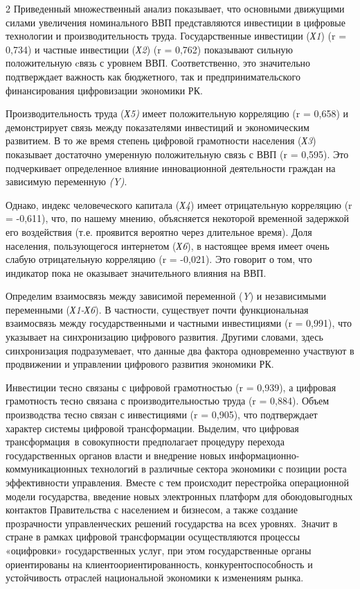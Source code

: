 \begin{multicols}{2}
Приведенный множественный анализ показывает, что основными движущими
силами увеличения номинального ВВП представляются инвестиции в цифровые
технологии и производительность труда. Государственные инвестиции
(\emph{Х1}) (r = 0,734) и частные инвестиции (\emph{Х2}) (r = 0,762)
показывают сильную положительную cвязь с уровнем ВВП. Соответственно,
это значительно подтверждает важность как бюджетного, так и
предпринимательского финансирования цифровизации экономики РК.

Производительность труда (\emph{Х5)} имеет положительную корреляцию (r =
0,658) и демонстрирует связь между показателями инвестиций и
экономическим развитием. В то же время степень цифровой грамотности
населения (\emph{Х3}) показывает достаточно умеренную положительную
связь с ВВП (r = 0,595). Это подчеркивает определенное влияние
инновационной деятельности граждан на зависимую переменную \emph{(Y)}.

Однако, индекс человеческого капитала (\emph{Х4}) имеет отрицательную
корреляцию (r = -0,611), что, по нашему мнению, объясняется некоторой
временной задержкой его воздействия (т.е. проявится вероятно через
длительное время). Доля населения, пользующегося интернетом (\emph{Х6}),
в настоящее время имеет очень слабую отрицательную корреляцию (r =
-0,021). Это говорит о том, что индикатор пока не оказывает
значительного влияния на ВВП.

Определим взаимосвязь между зависимой переменной (\emph{Y}) и
независимыми переменными (\emph{Х1-Х6}). В частности, существует почти
функциональная взаимосвязь между государственными и частными
инвестициями (r = 0,991), что указывает на синхронизацию цифрового
развития. Другими словами, здесь синхронизация подразумевает, что данные
два фактора одновременно участвуют в продвижении и управлении цифрового
развития экономики РК. ~

Инвестиции тесно связаны с цифровой грамотностью (r = 0,939), а цифровая
грамотность тесно связана с производительностью труда (r = 0,884). Объем
производства тесно связан с инвестициями (r = 0,905), что подтверждает
характер системы цифровой трансформации. Выделим, что цифровая
трансформация~в совокупности предполагает процедуру перехода
государственных органов власти и внедрение новых
информационно-коммуникационных технологий в различные сектора экономики
с позиции роста эффективности управления. Вместе с тем происходит
перестройка операционной модели государства, введение новых электронных
платформ для обоюдовыгодных контактов Правительства с населением и
бизнесом, а также создание прозрачности управленческих решений
государства на всех уровнях.~Значит в стране в рамках цифровой
трансформации осуществляются процессы «оцифровки» государственных услуг,
при этом государственные органы ориентированы на
клиентоориентированность, конкурентоспособность и устойчивость отраслей
национальной экономики к изменениям рынка.~


\end{multicols}
